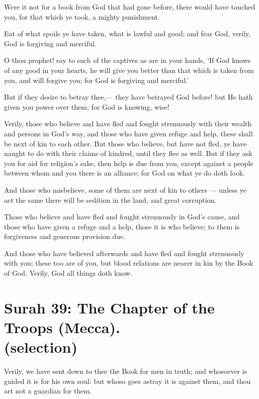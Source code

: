 \documentclass[fontsize=14pt, letterpaper, notitlepage, openany, DIV=12]{scrbook} %
\begin{document}
\noindent[8:68]
Were it not for a book from God that had gone before, there would have touched you, for
that which ye took, a mighty punishment.

\noindent[8:69]
Eat of what spoils ye have taken, what is lawful and good; and fear God, verily, God is
forgiving and merciful.

\noindent[8:70]
O thou prophet! say to such of the captives as are in your hands, `If God knows of any
good in your hearts, he will give you better than that which is taken from you, and will forgive
you; for God is forgiving and merciful.'

\noindent[8:71]
But if they desire to betray thee,--- they have betrayed God before! but He hath given you
power over them; for God is knowing, wise!

\noindent[8:72]
Verily, those who believe and have fled and fought strenuously with their wealth and
persons in God's way, and those who have given refuge and help, these shall be next of kin to
each other. But those who believe, but have not fled, ye have naught to do with their claims of
kindred, until they flee as well. But if they ask you for aid for religion's sake, then help is due
from you, except against a people between whom and you there is an alliance; for God on what
ye do doth look.

\noindent[8:73]
And those who misbelieve, some of them are next of kin to others --- unless ye act the
same there will be sedition in the land, and great corruption.

\noindent[8:74]
Those who believe and have fled and fought strenuously in God's cause, and those who
have given a refuge and a help, those it is who believe; to them is forgiveness and generous
provision due.

\noindent[8:75]
And those who have believed afterwards and have fled and fought strenuously with you;
these too are of you, but blood relations are nearer in kin by the Book of God. Verily, God all
things doth know.


\section[Surah 39: The Chapter of the Troops (Mecca).]{Surah 39: The Chapter of the Troops (Mecca).\\ (selection)}


\noindent[39:41]
Verily, we have sent down to thee the Book for men in truth; and whosoever is guided it
is for his own soul: but whoso goes astray it is against them, and thou art not a guardian for them.
\end{document}
